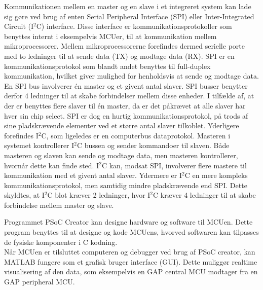 Kommunikationen mellem en master og en slave i et integreret system kan lade sig gøre ved brug af enten Serial Peripheral Interface (SPI) eller Inter-Integrated Circuit (I$^{2}$C) interface. Disse interface er kommunikationsprotokoller som benyttes internt i eksempelvis MCUer, til at kommunikation mellem mikroprocessorer. Mellem mikroprocessorerne forefindes dermed serielle porte med to ledninger til at sende data (TX) og modtage data (RX). \citep{Semiconductor2016} \newline
SPI er en kommunikationsprotokol som blandt andet benyttes til full-duplex kommunikation, hvilket giver mulighed for henholdsvis at sende og modtage data. En SPI bus involverer én master og et givent antal slaver. SPI busser benytter derfor 4 ledninger til at skabe forbindelser mellem disse enheder. I tilfælde af, at der er benyttes flere slaver til én master, da er det påkrævet at alle slaver har hver sin chip select. SPI er dog en hurtig kommunikationsprotokol, på trods af sine pladskrævende elementer ved et større antal slaver tilkoblet. \citep{Semiconductor2016,Sparkfun2016} \newline
Yderligere forefindes I$^{2}$C, som ligeledes er en computerbus dataprotokol. Masteren i systemet kontrollerer I$^{2}$C bussen og sender kommandoer til slaven. Både masteren og slaven kan sende og modtage data, men masteren kontrollerer, hvornår dette kan finde sted. \newline
I$^{2}$C kan, modsat SPI, involverer flere mastere til kommunikation med et givent antal slaver. Ydermere er I$^{2}$C en mere kompleks kommunikationsprotokol, men samtidig mindre pladskrævende end SPI. Dette skyldtes, at I$^{2}$C blot kræver 2 ledninger, hvor I$^{2}$C kræver 4 ledninger til at skabe forbindelse mellem master og slave. \citep{Semiconductor2016,Sparkfun2016}


Programmet PSoC Creator kan designe hardware og software til MCUen. Dette program benyttes til at designe og kode MCUens, hvorved softwaren kan tilpasses de fysiske komponenter i C kodning. \citep{Semiconductor2016} \\
Når MCUen er tilsluttet computeren og debugger ved brug af PSoC creator, kan MATLAB fungere som et grafisk bruger interface (GUI). Dette muliggør realtime visualisering af den data, som eksempelvis en GAP central MCU modtager fra en GAP peripheral MCU.\citep{Semiconductor2016,Sparkfun2016}

